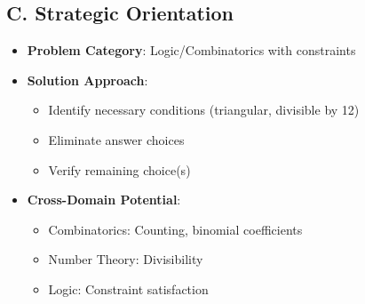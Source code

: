 \documentclass[12pt]{article}
\begin{document}
\begin{problemconfigbox}
\subsection*{C. Strategic Orientation}
\begin{itemize}[leftmargin=*]
    \item \textbf{Problem Category}: Logic/Combinatorics with constraints
    \item \textbf{Solution Approach}: 
    \begin{itemize}
        \item Identify necessary conditions (triangular, divisible by 12)
        \item Eliminate answer choices
        \item Verify remaining choice(s)
    \end{itemize}
    \item \textbf{Cross-Domain Potential}: 
    \begin{itemize}
        \item Combinatorics: Counting, binomial coefficients
        \item Number Theory: Divisibility
        \item Logic: Constraint satisfaction
    \end{itemize}
\end{itemize}
\end{problemconfigbox}
\end{document}
